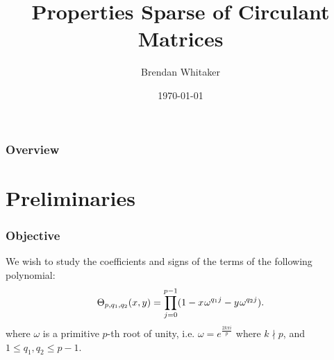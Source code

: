 \documentclass{beamer}
\title[Properties of Sparse Circulant Matrices]{Properties Sparse of Circulant Matrices} %
\author{Brendan Whitaker} %
\institute[] %
{
Ohio State University \\ %
\medskip
\textit{whitaker.213@osu.edu} %
}
\date{\today} %
\theoremstyle{plain}
\theoremstyle{definition}
\theoremstyle{remark}
\newcommand{\bee}{\begin{equation}\begin{aligned}}
\newcommand{\eee}{\end{aligned}\end{equation}}
\newcommand{\fracc}{\frac}				%
\renewcommand{\leq}{\leqslant}			%
\renewcommand{\'}{\hspace{0.5mm}'}		%
\begin{document}
\begin{frame}
\titlepage %
\end{frame}

\begin{frame}
\frametitle{Overview} %
\tableofcontents %
\end{frame}


\section{Preliminaries} %


\begin{frame}
\frametitle{Objective}
We wish to study the coefficients and signs of the terms of 
the following polynomial:
\bee
	\Theta_{p,q_1,q_2}(x,y) = \prod_{j = 0}^{p - 1} 
	(1 - x \hspace{0.25mm} \omega^{q_1j} 
	- y \hspace{0.25mm} \omega^{q_2j}).
\eee
where $\omega$ is a primitive $p$-th root of unity, i.e.
$\omega = e^{\fracc{2k\pi i }{p}}$ where $k \nmid p$, and 
$1 \leq q_1,q_2 \leq p - 1$. 




\end{frame}
\end{document}
